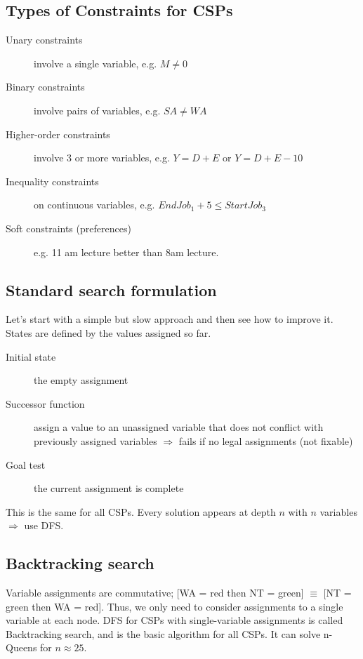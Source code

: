 \subsection{Types of Constraints for CSPs}
\begin{description}
    \item[Unary constraints] involve a single variable, e.g. $M \neq 0$
    \item[Binary constraints] involve pairs of variables, e.g. $SA \neq WA$
    \item[Higher-order constraints] involve 3 or more variables, e.g. $Y = D +
    E$ or $Y = D + E - 10$
    \item[Inequality constraints] on continuous variables, e.g. $EndJob_1 + 5
    \leq StartJob_3$
    \item[Soft constraints (preferences)] e.g. 11 am lecture better than 8am
    lecture.
\end{description}

\subsection{Standard search formulation}
Let's start with a simple but slow approach and then see how to improve it.\\
States are defined by the values assigned so far.
\begin{description}
    \item[Initial state] the empty assignment
    \item[Successor function] assign a value to an unassigned variable that
    does not conflict with previously assigned variables $\Rightarrow$ fails if
    no legal assignments (not fixable)
    \item[Goal test] the current assignment is complete
\end{description}

This is the same for all CSPs. Every solution appears at depth $n$ with $n$
variables $\Rightarrow$ use DFS.

\subsection{Backtracking search}
Variable assignments are commutative; [WA = red then NT = green] $\equiv$ [NT =
green then WA = red]. Thus, we only need to consider assignments to a single
variable at each node. DFS for CSPs with single-variable assignments is called
Backtracking search, and is the basic algorithm for all CSPs. It can solve
n-Queens for $n \approx 25$.

